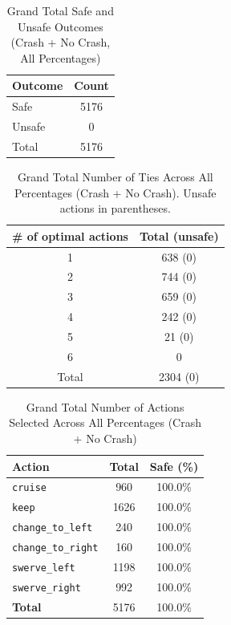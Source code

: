 \documentclass{article}
\begin{document}
\begin{table}[h]
\centering
\caption{Grand Total Safe and Unsafe Outcomes (Crash + No Crash, All Percentages)}
\begin{tabular}{lc}
\toprule
Outcome & Count \\
\midrule
Safe & 5176 \\ 
Unsafe & 0 \\ 
\midrule
Total & 5176 \\ 
\bottomrule
\end{tabular}
\end{table}

\begin{table}[h]
\centering
\caption{Grand Total Number of Ties Across All Percentages (Crash + No Crash).
Unsafe actions in parentheses.}
\begin{tabular}{c|c}
\toprule
\# of optimal actions & Total (unsafe) \\
\midrule
1 & 638 (0) \\ 
2 & 744 (0) \\ 
3 & 659 (0) \\ 
4 & 242 (0) \\ 
5 & 21 (0) \\ 
6 & 0 \\ 
\midrule
Total & 2304 (0) \\ 
\bottomrule
\end{tabular}
\end{table}

\begin{table}[h]
\centering
\caption{Grand Total Number of Actions Selected Across All Percentages (Crash + No Crash)}
\begin{tabular}{l|c|c}
\toprule
Action & Total & Safe (\%) \\
\midrule
\texttt{cruise} & 960 & 100.0\% \\ 
\texttt{keep} & 1626 & 100.0\% \\ 
\texttt{change\_to\_left} & 240 & 100.0\% \\ 
\texttt{change\_to\_right} & 160 & 100.0\% \\ 
\texttt{swerve\_left} & 1198 & 100.0\% \\ 
\texttt{swerve\_right} & 992 & 100.0\% \\ 
\midrule
\textbf{Total} & 5176 & 100.0\% \\ 
\bottomrule
\end{tabular}
\end{table}
\end{document}
